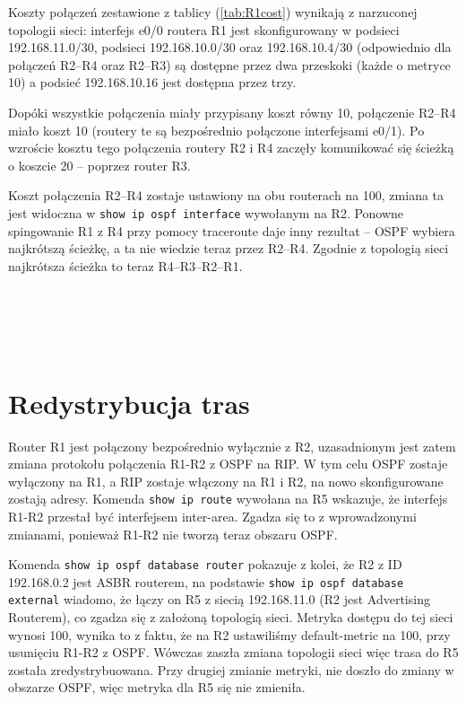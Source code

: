 \documentclass[a4paper,12pt,notitlepage]{article}
\begin{document}
Koszty połączeń zestawione z tablicy (\ref{tab:R1cost}) wynikają z narzuconej topologii sieci: interfejs e0/0 routera R1 jest skonfigurowany w podsieci 192.168.11.0/30, podsieci 192.168.10.0/30 oraz 192.168.10.4/30 (odpowiednio dla połączeń R2--R4 oraz R2--R3) są dostępne przez dwa przeskoki (każde o metryce 10) a podsieć 192.168.10.16 jest dostępna przez trzy.

Dopóki wszystkie połączenia miały przypisany koszt równy 10, połączenie R2--R4 miało koszt 10 (routery te są bezpośrednio połączone interfejsami e0/1). Po wzroście kosztu tego połączenia routery R2 i R4 zaczęły komunikować się ścieżką o koszcie 20 -- poprzez router R3.

Koszt połączenia R2--R4 zostaje ustawiony na obu routerach na 100, zmiana ta jest widoczna w \texttt{show ip ospf interface} wywołanym na R2. Ponowne spingowanie R1 z R4 przy pomocy traceroute daje inny rezultat -- OSPF wybiera najkrótszą ścieżkę, a ta nie wiedzie teraz przez R2--R4. Zgodnie z topologią sieci najkrótsza ścieżka to teraz R4--R3--R2--R1.

\inputminted[label=Router R4 - \#ping 192.168.11.1, firstline=377, lastline=379]{text}{R4.txt}
\inputminted[label=Router R4 - \#traceroute 192.168.11.1, firstline=394, lastline=397]{text}{R4.txt}

\inputminted[label=Router R2 - koszty łączy, firstline=247, lastline=251]{text}{R2.txt}

\inputminted[label=Router R2 - koszty łączy po zmianie, firstline=325, lastline=372]{text}{R2.txt}

\inputminted[label=Router R4 - \#ping 192.168.11.1, firstline=535, lastline=537]{text}{R4.txt}
\inputminted[label=Router R4 - \#traceroute 192.168.11.1, firstline=541, lastline=545]{text}{R4.txt}

\section{Redystrybucja tras}
Router R1 jest połączony bezpośrednio wyłącznie z R2, uzasadnionym jest zatem zmiana protokołu połączenia R1-R2 z OSPF na RIP. W tym celu OSPF zostaje wyłączony na R1, a RIP zostaje włączony na R1 i R2, na nowo skonfigurowane zostają adresy. Komenda \texttt{show ip route} wywołana na R5 wskazuje, że interfejs R1-R2 przestał być interfejsem inter-area. Zgadza się to z wprowadzonymi zmianami, ponieważ R1-R2 nie tworzą teraz obszaru OSPF. 

Komenda \texttt{show ip ospf database router} pokazuje z kolei, że R2 z ID 192.168.0.2 jest ASBR routerem, na podstawie  \texttt{show ip ospf database external} wiadomo, że łączy on R5 z siecią 192.168.11.0 (R2 jest Advertising Routerem), co zgadza się z założoną topologią sieci. Metryka dostępu do tej sieci wynosi 100, wynika to z faktu, że na R2 ustawiliśmy default-metric na 100, przy usunięciu R1-R2 z OSPF. Wówczas zaszła zmiana topologii sieci więc trasa do R5 została zredystrybuowana. Przy drugiej zmianie metryki, nie doszło do zmiany w obszarze OSPF, więc metryka dla R5 się nie zmieniła.
\inputminted[label=Router R1 - \#show ip route, firstline=838, lastline=844]{text}{R1.txt}
\inputminted[label=Router R5 - \#show ip route, firstline=718, lastline=728]{text}{R5.txt}

\inputminted[label=Router R5 - stan końcowy, firstline=729, lastline=817]{text}{R5.txt}
\end{document}
